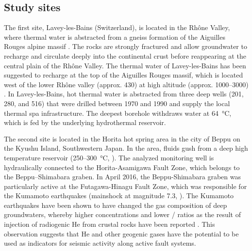 \subsection{Study sites}
The first site, Lavey-les-Bains (Switzerland), is located in the Rhône Valley, where thermal water is abstracted from a gneiss formation of the Aiguilles Rouges alpine massif \citep{sonney2009numerical, sonney2012circulation}. 
The rocks are strongly fractured and allow groundwater to recharge and circulate deeply into the continental crust before reappearing at the central plain of the Rhône Valley.
The thermal water of Lavey-les-Bains has been suggested to recharge at the top of the Aiguilles Rouges massif, which is located west of the lower Rhône valley (approx. \SI{430}{\masl}) at high altitude (approx. 1000--\SI{3000}{\masl}) \citep{sonney2009numerical, sonney2012circulation}.
In Lavey-les-Bains, hot thermal water is abstracted from three deep wells (\SI{201}{\mbgl}, \SI{280}{\mbgl}, and \SI{516}{\mbgl}) that were drilled between 1970 and 1990 and supply the local thermal spa infrastructure.
The deepest borehole withdraws water at \SI{64}{\celsius}, which is fed by the underlying hydrothermal reservoir.

The second site is located in the Horita hot spring area in the city of Beppu on the Kyushu Island, Southwestern Japan.
In the area, fluids gush from a deep high temperature reservoir (250--\SI{300}{\celsius}, \cite{sturchio1996beppu, allis1989beppu}).
The analyzed monitoring well is hydraulically connected to the Horita-Asamigawa Fault Zone, which belongs to the Beppu–Shimabara graben.
In April 2016, the Beppu-Shimabara graben was particularly active at the Futagawa-Hinagu Fault Zone, which was responsible for the Kumamoto earthquakes (mainshock at magnitude 7.3, \cite{ide2020kumamoto}).
The Kumamoto earthquakes have been shown to have changed the gas composition of deep groundwaters, whereby higher  concentrations and lower / ratios as the result of injection of radiogenic He from crustal rocks have been reported \citep{sano2016kumamoto}.  
This observation suggests that He and other geogenic gases have the potential to be used as indicators for seismic activity along active fault systems. 

